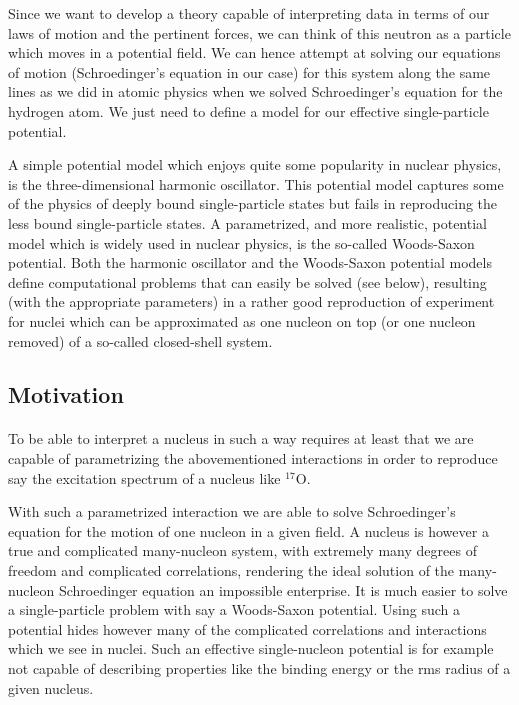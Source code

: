 \documentclass[%
twoside,                 %
final,                   %
10pt]{article}
\begin{document}
Since we want to develop a theory capable of interpreting data in terms of our laws of motion and the pertinent forces,
we can think of this neutron as a particle which moves in a potential field. We can hence attempt at solving our equations of motion (Schroedinger's equation in our case) for this system along the same lines as we did in atomic physics when we solved Schroedinger's equation for the hydrogen atom. We just need to define a model for our effective single-particle potential. 

A simple potential model which enjoys quite some popularity in nuclear physics, is the three-dimensional harmonic oscillator. This potential model captures some of the physics of deeply bound single-particle states but fails in reproducing 
the less bound single-particle states. A parametrized, and more realistic,  potential model which is widely used in nuclear physics, is the so-called Woods-Saxon potential. Both the harmonic oscillator and the Woods-Saxon potential models define computational problems that can easily be solved (see below), resulting (with the appropriate parameters) in a rather good reproduction of experiment for nuclei which can be approximated as one nucleon on top (or one nucleon removed) of a so-called closed-shell system.




\subsection*{Motivation}

\paragraph{}

To be able to interpret a nucleus in such  a way requires at least that we are capable of parametrizing the abovementioned
interactions in order to reproduce say the excitation spectrum of a nucleus like ${}^{17}\mbox{O}$. 

With such a parametrized interaction we are able to solve Schroedinger's equation for the motion of one nucleon in a given field. A nucleus is however a true and complicated many-nucleon system, with extremely many degrees of freedom and complicated correlations, rendering the ideal solution of the many-nucleon Schroedinger equation an impossible enterprise. It is much easier to solve a single-particle problem with say a Woods-Saxon potential. Using such a potential hides however many of the complicated correlations and interactions which we see in nuclei. Such an effective single-nucleon potential is for example not capable of 
describing properties like the binding energy or the rms radius of a given nucleus. 
\end{document}
